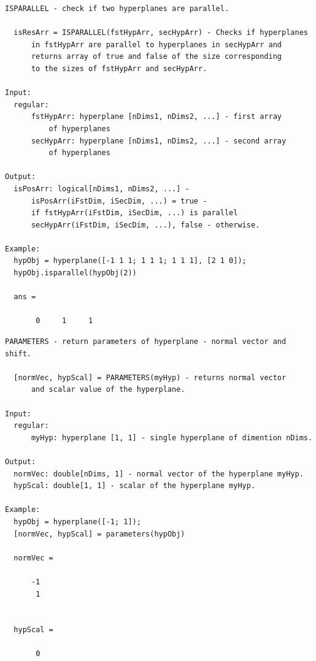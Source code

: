 \documentclass[letterpaper,10pt,english]{sphinxmanual}
\begin{document}
\begin{Verbatim}[commandchars=\\\{\}]
ISPARALLEL - check if two hyperplanes are parallel.

  isResArr = ISPARALLEL(fstHypArr, secHypArr) - Checks if hyperplanes
      in fstHypArr are parallel to hyperplanes in secHypArr and
      returns array of true and false of the size corresponding
      to the sizes of fstHypArr and secHypArr.

Input:
  regular:
      fstHypArr: hyperplane [nDims1, nDims2, ...] - first array
          of hyperplanes
      secHypArr: hyperplane [nDims1, nDims2, ...] - second array
          of hyperplanes

Output:
  isPosArr: logical[nDims1, nDims2, ...] -
      isPosArr(iFstDim, iSecDim, ...) = true -
      if fstHypArr(iFstDim, iSecDim, ...) is parallel
      secHypArr(iFstDim, iSecDim, ...), false - otherwise.

Example:
  hypObj = hyperplane([-1 1 1; 1 1 1; 1 1 1], [2 1 0]);
  hypObj.isparallel(hypObj(2))

  ans =

       0     1     1
\end{Verbatim}

\begin{Verbatim}[commandchars=\\\{\}]
PARAMETERS - return parameters of hyperplane - normal vector and shift.

  [normVec, hypScal] = PARAMETERS(myHyp) - returns normal vector
      and scalar value of the hyperplane.

Input:
  regular:
      myHyp: hyperplane [1, 1] - single hyperplane of dimention nDims.

Output:
  normVec: double[nDims, 1] - normal vector of the hyperplane myHyp.
  hypScal: double[1, 1] - scalar of the hyperplane myHyp.

Example:
  hypObj = hyperplane([-1; 1]);
  [normVec, hypScal] = parameters(hypObj)

  normVec =

      -1
       1


  hypScal =

       0
\end{Verbatim}
\end{document}
